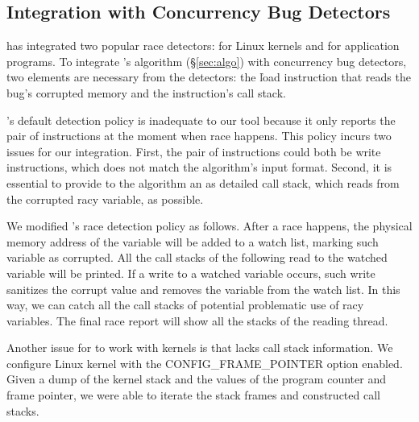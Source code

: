 \subsection{Integration with Concurrency Bug Detectors}
\label{sec:integration}

\xxx has integrated two popular race detectors: \ski for
Linux kernels and \tsan for application programs. To integrate \xxx's
algorithm (\S\ref{sec:algo}) with concurrency bug detectors, two 
elements are necessary from the detectors: the \v{load} instruction that reads 
the bug's corrupted memory and the instruction's call stack.


\ski's default detection policy is inadequate to our tool because it only reports the
pair of instructions at the moment when race happens. This policy incurs two
issues for our integration. First, the pair of instructions could both be write
instructions, which does not match the algorithm's input format. Second, it is
essential to provide to the algorithm an as detailed call stack, which reads 
from the corrupted racy variable, as possible.

We modified \ski's race detection policy as follows. After a race happens, the
physical memory address of the variable will be added to a \ski watch list,
marking such variable as corrupted. All the call stacks of the following read to
the watched variable will be printed. If a write to a watched variable occurs,
such write sanitizes the corrupt value and removes the variable from the watch
list. In this way, we can catch all the call stacks of potential problematic 
use of racy variables. The final race report will show all the stacks of the 
reading thread.
% 

Another issue for \xxx to work with kernels is that \ski lacks call stack 
information. We configure Linux kernel with the CONFIG\_FRAME\_POINTER option 
enabled. Given a dump of the kernel stack and the values of the program counter 
and frame pointer, we were able to iterate the stack frames and constructed call 
stacks.

